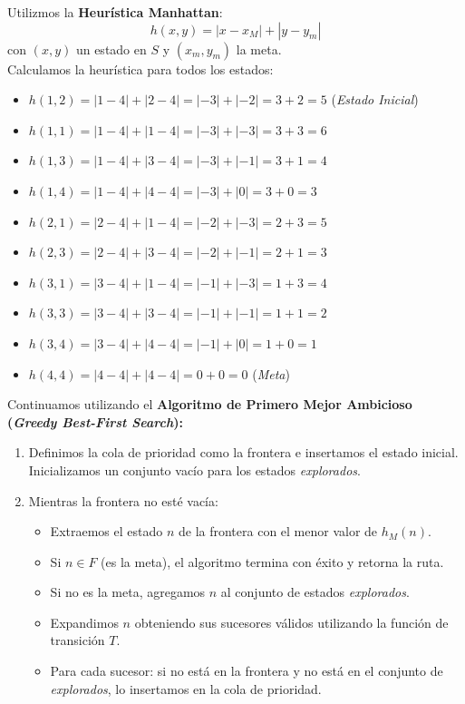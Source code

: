 Utilizmos la \textbf{Heurística Manhattan}:
\[
h(x,y) = |x - x_M| + |y - y_m|
\]
con $(x,y)$ un estado en $S$ y $(x_m,y_m)$ la meta.\\

Calculamos la heurística para todos los estados:

\begin{itemize}
\item $h(1,2) = |1 - 4| + |2 - 4| = |-3| + |-2| = 3 + 2 = 5$ \; (\textit{Estado Inicial})
\item $h(1,1) = |1 - 4| + |1 - 4| = |-3| + |-3| = 3 + 3 = 6$
\item $h(1,3) = |1 - 4| + |3 - 4| = |-3| + |-1| = 3 + 1 = 4$
\item $h(1,4) = |1 - 4| + |4 - 4| = |-3| + |0| = 3 + 0 = 3$
\item $h(2,1) = |2 - 4| + |1 - 4| = |-2| + |-3| = 2 + 3 = 5$
\item $h(2,3) = |2 - 4| + |3 - 4| = |-2| + |-1| = 2 + 1 = 3$
\item $h(3,1) = |3 - 4| + |1 - 4| = |-1| + |-3| = 1 + 3 = 4$
\item $h(3,3) = |3 - 4| + |3 - 4| = |-1| + |-1| = 1 + 1 = 2$
\item $h(3,4) = |3 - 4| + |4 - 4| = |-1| + |0| = 1 + 0 = 1$
\item $h(4,4) = |4 - 4| + |4 - 4| = 0 + 0 = 0$ \qquad \qquad \qquad \; (\textit{Meta})
\end{itemize}

\bigskip

Continuamos utilizando el \textbf{Algoritmo de Primero Mejor Ambicioso (\textit{Greedy Best-First Search}):}
\begin{enumerate}
\item Definimos la cola de prioridad como la frontera e insertamos el estado inicial. Inicializamos un conjunto vacío para los estados \textit{explorados}.
\item Mientras la frontera no esté vacía:
  \begin{itemize}
  \item Extraemos el estado $n$ de la frontera con el menor valor de $h_M(n)$.
  \item Si $n \in F$ (es la meta), el algoritmo termina con éxito y retorna la ruta.
  \item Si no es la meta, agregamos $n$ al conjunto de estados \textit{explorados}.
  \item Expandimos $n$ obteniendo sus sucesores válidos utilizando la función de transición $T$.
  \item Para cada sucesor: si no está en la frontera y no está en el conjunto de \textit{explorados}, lo insertamos en la cola de prioridad.
  \end{itemize}
\end{enumerate}

